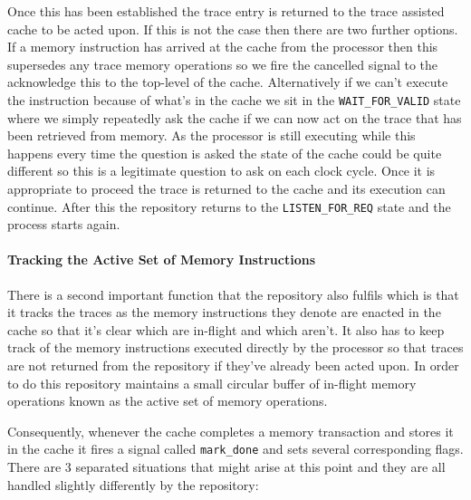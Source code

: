 Once this has been established the trace entry is returned to the trace assisted cache to be acted upon. If this is not the case then there are two further options. If a memory instruction has arrived at the cache from the processor then this supersedes any trace memory operations so we fire the cancelled signal to the acknowledge this to the top-level of the cache. Alternatively if we can't execute the instruction because of what's in the cache we sit in the \texttt{WAIT\_FOR\_VALID} state where we simply repeatedly ask the cache if we can now act on the trace that has been retrieved from memory. As the processor is still executing while this happens every time the question is asked the state of the cache could be quite different so this is a legitimate question to ask on each clock cycle. Once it is appropriate to proceed the trace is returned to the cache and its execution can continue. After this the repository returns to the \texttt{LISTEN\_FOR\_REQ} state and the process starts again.

\paragraph{Tracking the Active Set of Memory Instructions}

There is a second important function that the repository also fulfils which is that it tracks the traces as the memory instructions they denote are enacted in the cache so that it's clear which are in-flight and which aren't. It also has to keep track of the memory instructions executed directly by the processor so that traces are not returned from the repository if they've already been acted upon. In order to do this repository maintains a small circular buffer of in-flight memory operations known as the active set of memory operations. 

Consequently, whenever the cache completes a memory transaction and stores it in the cache it fires a signal called \texttt{mark\_done} and sets several corresponding flags. There are 3 separated situations that might arise at this point and they are all handled slightly differently by the repository:

